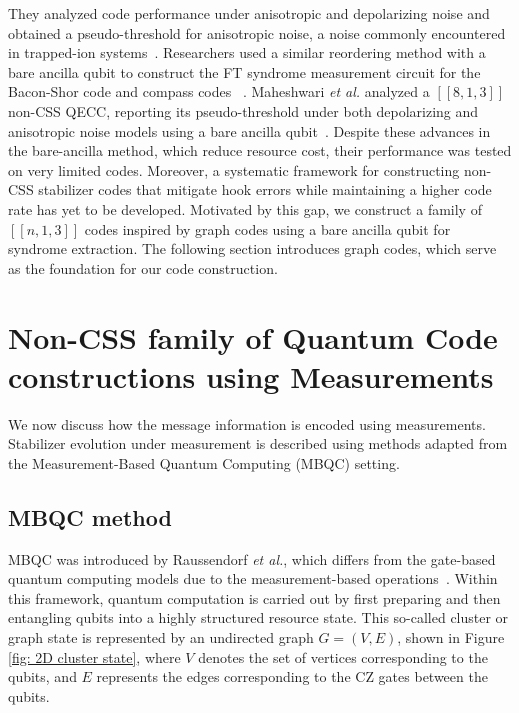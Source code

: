 \documentclass[reprint, amsmath,amssymb, aps,pra,
 floatfix,
]{revtex4-2}
\begin{document}
They analyzed code performance under anisotropic and depolarizing noise and obtained a pseudo-threshold for anisotropic noise, a noise commonly encountered in trapped-ion systems~\cite{parrado2020crosstalk}. 
Researchers used a similar reordering method with a bare ancilla qubit to construct the FT syndrome measurement circuit for the Bacon-Shor code and compass codes ~\cite{PhysRevA.98.050301,huang2020fault}.
Maheshwari \emph{et al.}  analyzed a $[[8,1,3]]$ non-CSS QECC, reporting its pseudo-threshold under both depolarizing and anisotropic noise models using a bare ancilla qubit~\cite{maheshwari2024fault}.
Despite these advances in the bare-ancilla method, which reduce resource cost, their performance was tested on very limited codes.
Moreover, a systematic framework for constructing non-CSS stabilizer codes that mitigate hook errors while maintaining a higher code rate has yet to be developed.
Motivated by this gap, we construct a family of $[[n,1,3]]$ codes inspired by graph codes using a bare ancilla qubit for syndrome extraction.
The following section introduces graph codes, which serve as the foundation for our code construction.
\section{Non-CSS family of Quantum Code constructions using Measurements}

\label{sec: MBQC construct QECC}
\noindent We now discuss how the message information is encoded using measurements.
Stabilizer evolution under measurement is described using methods adapted from the Measurement-Based Quantum Computing (MBQC) setting.
\subsection{MBQC method}
\noindent MBQC was introduced by Raussendorf \emph{et al.}, which differs from the gate-based quantum computing models due to the measurement-based operations~\cite{PhysRevA.68.022312}.
Within this framework, quantum computation is carried out by first preparing and then entangling qubits into a highly structured resource state.
This so-called cluster or graph state is represented by an undirected graph $G = (V, E)$, shown in Figure \ref{fig: 2D cluster state}, where $V$  denotes the set of vertices corresponding to the qubits, and $E$ represents the edges corresponding to the $\mathrm{CZ}$ gates between the qubits.\\
\end{document}
